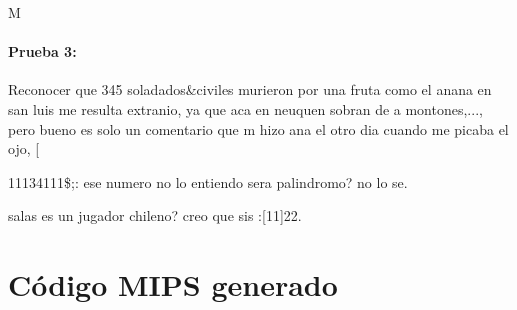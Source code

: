 \documentclass[a4paper]{article}
\begin{document}
M

\paragraph{Prueba 3:} 

Reconocer que 345 soladados&civiles murieron por una fruta como el anana en san luis me resulta extranio, ya que aca en neuquen sobran de a montones,..., pero bueno es solo un comentario que m hizo ana el otro dia cuando me picaba el ojo, [{11134111\$;: ese numero no lo entiendo sera palindromo? no lo se.

salas es un jugador chileno? creo que sis :[11]22.

\pagebreak
    
\section{Código MIPS generado} 

}
\end{document}
